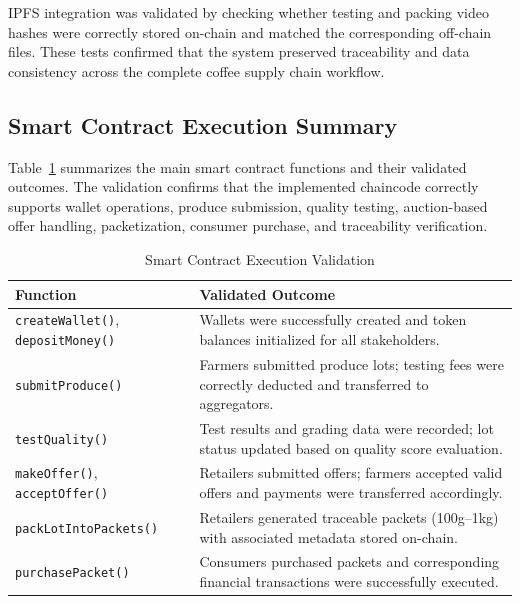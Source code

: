 \documentclass[manuscript,screen,nofonts]{acmart}
\begin{document}
IPFS integration was validated by checking whether testing and packing video hashes were correctly stored on-chain and matched the corresponding off-chain files. These tests confirmed that the system preserved traceability and data consistency across the complete coffee supply chain workflow.

\subsection{Smart Contract Execution Summary}

Table~\ref{tab:smartcontract-validation} summarizes the main smart contract functions and their validated outcomes. The validation confirms that the implemented chaincode correctly supports wallet operations, produce submission, quality testing, auction-based offer handling, packetization, consumer purchase, and traceability verification.
	
	\begin{table}[ht]
		\centering
		\caption{Smart Contract Execution Validation}
		\label{tab:smartcontract-validation}
		\renewcommand{\arraystretch}{1.3}
		\begin{tabular}{|p{4cm}|p{9cm}|}
			\hline
			\textbf{Function} & \textbf{Validated Outcome} \\
			\hline
			\texttt{createWallet()}, \texttt{depositMoney()}  & Wallets were successfully created and token balances initialized for all stakeholders. \\
			\hline
			\texttt{submitProduce()} & Farmers submitted produce lots; testing fees were correctly deducted and transferred to aggregators. \\
			\hline
			\texttt{testQuality()}  & Test results and grading data were recorded; lot status updated based on quality score evaluation. \\
			\hline
			\texttt{makeOffer()}, \texttt{acceptOffer()} & Retailers submitted offers; farmers accepted valid offers and payments were transferred accordingly. \\
			\hline
			\texttt{packLotIntoPackets()} & Retailers generated traceable packets (100g–1kg) with associated metadata stored on-chain. \\
			\hline
			\texttt{purchasePacket()} & Consumers purchased packets and corresponding financial transactions were successfully executed. \\
			\hline
		\end{tabular}
	\end{table}
	
\end{document}
